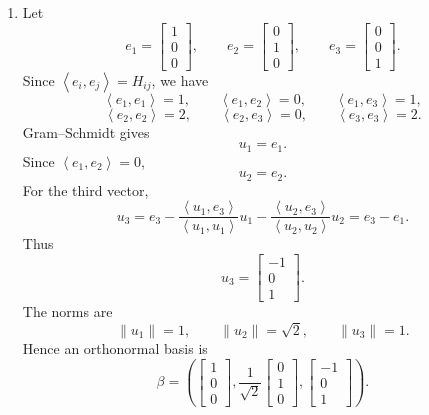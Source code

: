\documentclass[12pt]{article}
\newcommand{\ip}[2]{\left\langle #1,#2\right\rangle}
\begin{document}
\begin{enumerate}[label=(\alph*)]
  \item Let
  \[
    e_1=\begin{bmatrix}1\\0\\0\end{bmatrix},
    \qquad
    e_2=\begin{bmatrix}0\\1\\0\end{bmatrix},
    \qquad
    e_3=\begin{bmatrix}0\\0\\1\end{bmatrix}.
  \]
  Since $\ip{e_i}{e_j}=H_{ij}$, we have
  \[
    \ip{e_1}{e_1}=1,
    \qquad
    \ip{e_1}{e_2}=0,
    \qquad
    \ip{e_1}{e_3}=1,
  \]
  \[
    \ip{e_2}{e_2}=2,
    \qquad
    \ip{e_2}{e_3}=0,
    \qquad
    \ip{e_3}{e_3}=2.
  \]
  Gram--Schmidt gives
  \[
    u_1=e_1.
  \]
  Since $\ip{e_1}{e_2}=0$,
  \[
    u_2=e_2.
  \]
  For the third vector,
  \[
    u_3=e_3-\frac{\ip{u_1}{e_3}}{\ip{u_1}{u_1}}u_1
        -\frac{\ip{u_2}{e_3}}{\ip{u_2}{u_2}}u_2
        =e_3-e_1.
  \]
  Thus
  \[
    u_3=\begin{bmatrix}-1\\0\\1\end{bmatrix}.
  \]
  The norms are
  \[
    \|u_1\|=1,
    \qquad
    \|u_2\|=\sqrt{2},
    \qquad
    \|u_3\|=1.
  \]
  Hence an orthonormal basis is
  \[
    \boxed{
    \beta=
    \left(
    \begin{bmatrix}1\\0\\0\end{bmatrix},
    \frac{1}{\sqrt2}\begin{bmatrix}0\\1\\0\end{bmatrix},
    \begin{bmatrix}-1\\0\\1\end{bmatrix}
    \right).}
  \]


\end{enumerate}
\end{document}
